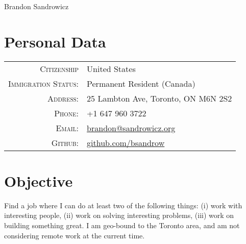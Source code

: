 \documentclass[a4paper,10pt]{article}
\begin{document}
    \pagestyle{empty} %

    
        \par{\centering
            {\Huge Brandon Sandrowicz }
            \bigskip\par}
    

    
        \section{Personal Data}
        \begin{tabular}{rl}
        \textsc{Citizenship}                    & United States\\
        \textsc{Immigration Status:}            & Permanent Resident (Canada)\\
        \textsc{Address:}                       & 25 Lambton Ave, Toronto, ON M6N 2S2\\
        \textsc{Phone:}                         & +1 647 960 3722\\
        \textsc{Email:}                         & \href{mailto:brandon@sandrowicz.org}{brandon@sandrowicz.org}\\
        \textsc{Github:}                        & \href{http://github.com/bsandrow}{github.com/bsandrow}\\
        \end{tabular}
    

    
        \section{Objective}
        Find a job where I can do at least two of the following things: (i) work with
        interesting people, (ii) work on solving interesting problems, (iii) work on
        building something great. I am geo-bound to the Toronto area, and am not
        considering remote work at the current time.
    

    
\end{document}
